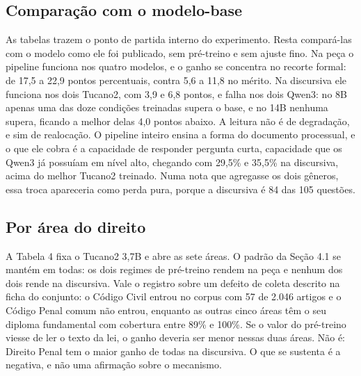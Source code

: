 \documentclass{IOS-Book-Article}
\begin{document}
\subsection{Comparação com o modelo-base}
As tabelas trazem o ponto de partida interno do experimento. Resta compará-las com o modelo como ele foi publicado, sem pré-treino e sem ajuste fino. Na peça o pipeline funciona nos quatro modelos, e o ganho se concentra no recorte formal: de 17,5 a 22,9 pontos percentuais, contra 5,6 a 11,8 no mérito. Na discursiva ele funciona nos dois Tucano2, com 3,9 e 6,8 pontos, e falha nos dois Qwen3: no 8B apenas uma das doze condições treinadas supera o base, e no 14B nenhuma supera, ficando a melhor delas 4,0 pontos abaixo. A leitura não é de degradação, e sim de realocação. O pipeline inteiro ensina a forma do documento processual, e o que ele cobra é a capacidade de responder pergunta curta, capacidade que os Qwen3 já possuíam em nível alto, chegando com 29,5\% e 35,5\% na discursiva, acima do melhor Tucano2 treinado. Numa nota que agregasse os dois gêneros, essa troca apareceria como perda pura, porque a discursiva é 84 das 105 questões.
\subsection{Por área do direito}
A Tabela 4 fixa o Tucano2 3,7B e abre as sete áreas. O padrão da Seção 4.1 se mantém em todas: os dois regimes de pré-treino rendem na peça e nenhum dos dois rende na discursiva. Vale o registro sobre um defeito de coleta descrito na ficha do conjunto: o Código Civil entrou no corpus com 57 de 2.046 artigos e o Código Penal comum não entrou, enquanto as outras cinco áreas têm o seu diploma fundamental com cobertura entre 89\% e 100\%. Se o valor do pré-treino viesse de ler o texto da lei, o ganho deveria ser menor nessas duas áreas. Não é: Direito Penal tem o maior ganho de todas na discursiva. O que se sustenta é a negativa, e não uma afirmação sobre o mecanismo.
\end{document}
